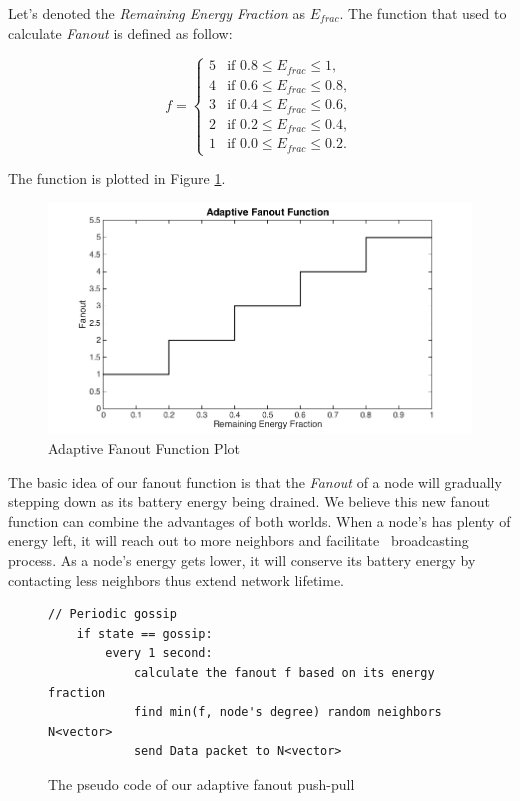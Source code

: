 Let's denoted the \emph{Remaining Energy Fraction} as $E_{frac}$. The function that used to calculate \emph{Fanout} is defined as follow:

\begin{equation*}
	f = \left\{
	\begin{array}{rl}
		5 & \text{if } 0.8 \leq E_{frac} \leq 1,\\
		4 & \text{if } 0.6 \leq E_{frac} \leq 0.8,\\
		3 & \text{if } 0.4 \leq E_{frac} \leq 0.6,\\
		2 & \text{if } 0.2 \leq E_{frac} \leq 0.4,\\					
		1 & \text{if } 0.0 \leq E_{frac} \leq 0.2.
	\end{array} \right.
\end{equation*}

The function is plotted in Figure \ref{fig:step}.

\begin{figure}[h]
	\centering
	\includegraphics[width=5.5in]{stepFunction2.png}
	\caption{Adaptive Fanout Function Plot}
	\label{fig:step}
\end{figure}

The basic idea of our fanout function is that the \emph{Fanout} of a node will gradually stepping down as its battery energy being drained. We believe this new fanout function can combine the advantages of both worlds. When a node's has plenty of energy left, it will reach out to more neighbors and facilitate \msg ~broadcasting process. As a node's energy gets lower, it will conserve its battery energy by contacting less neighbors thus extend network lifetime.

\begin{figure}[!htbp]
	\centering
	\begin{Verbatim}[fontsize=\small]	
	// Periodic gossip	
	if state == gossip:
		every 1 second:
			calculate the fanout f based on its energy fraction
			find min(f, node's degree) random neighbors N<vector>
			send Data packet to N<vector>
	\end{Verbatim}
	\caption{The pseudo code of our adaptive fanout push-pull \gp}
	\label{fig:gossip}
\end{figure}

